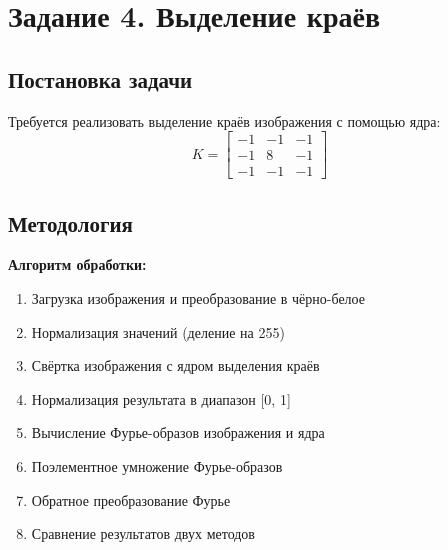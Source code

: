\section*{Задание 4. Выделение краёв}

\subsection*{Постановка задачи}

Требуется реализовать выделение краёв изображения с помощью ядра:
\begin{equation}
K = \begin{bmatrix}
-1 & -1 & -1 \\
-1 & 8 & -1 \\
-1 & -1 & -1
\end{bmatrix}
\end{equation}

\subsection*{Методология}

\textbf{Алгоритм обработки:}
\begin{enumerate}
    \item Загрузка изображения и преобразование в чёрно-белое
    \item Нормализация значений (деление на 255)
    \item Свёртка изображения с ядром выделения краёв
    \item Нормализация результата в диапазон [0, 1]
    \item Вычисление Фурье-образов изображения и ядра
    \item Поэлементное умножение Фурье-образов
    \item Обратное преобразование Фурье
    \item Сравнение результатов двух методов
\end{enumerate}

